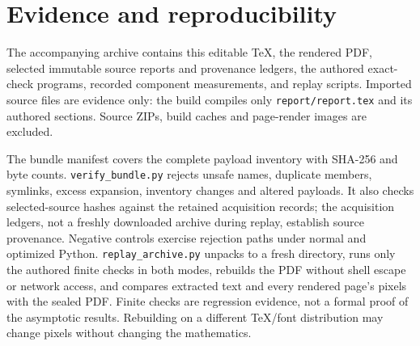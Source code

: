 \documentclass[11pt,letterpaper]{article}
\theoremstyle{remark}\newtheorem{remark}[theorem]{Remark}
\begin{document}
\section{Evidence and reproducibility}\label{sec:repro}
The accompanying archive contains this editable TeX, the rendered PDF, selected immutable source reports and provenance ledgers, the authored exact-check programs, recorded component measurements, and replay scripts. Imported source files are evidence only: the build compiles only \texttt{report/report.tex} and its authored sections. Source ZIPs, build caches and page-render images are excluded.



The bundle manifest covers the complete payload inventory with SHA-256 and byte counts. \texttt{verify\_bundle.py} rejects unsafe names, duplicate members, symlinks, excess expansion, inventory changes and altered payloads. It also checks selected-source hashes against the retained acquisition records; the acquisition ledgers, not a freshly downloaded archive during replay, establish source provenance. Negative controls exercise rejection paths under normal and optimized Python. \texttt{replay\_archive.py} unpacks to a fresh directory, runs only the authored finite checks in both modes, rebuilds the PDF without shell escape or network access, and compares extracted text and every rendered page's pixels with the sealed PDF. Finite checks are regression evidence, not a formal proof of the asymptotic results. Rebuilding on a different TeX/font distribution may change pixels without changing the mathematics.
\end{document}
